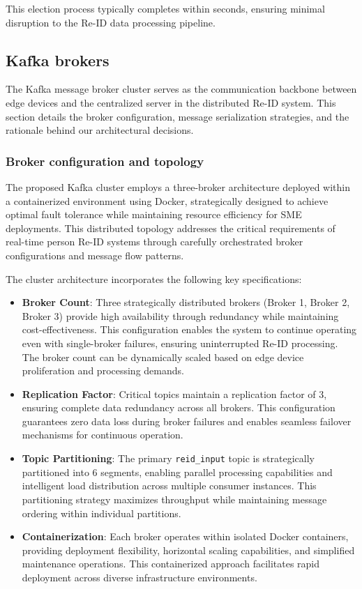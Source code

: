 This election process typically completes within seconds, ensuring minimal disruption to the Re-ID data processing pipeline.

\subsection{Kafka brokers}

The Kafka message broker cluster serves as the communication backbone between edge devices and the centralized server in the distributed Re-ID system. This section details the broker configuration, message serialization strategies, and the rationale behind our architectural decisions.

\subsubsection{Broker configuration and topology}

The proposed Kafka cluster employs a three-broker architecture deployed within a containerized environment using Docker, strategically designed to achieve optimal fault tolerance while maintaining resource efficiency for SME deployments. This distributed topology addresses the critical requirements of real-time person Re-ID systems through carefully orchestrated broker configurations and message flow patterns.

The cluster architecture incorporates the following key specifications:

\begin{itemize}
   \item \textbf{Broker Count}: Three strategically distributed brokers (Broker 1, Broker 2, Broker 3) provide high availability through redundancy while maintaining cost-effectiveness. This configuration enables the system to continue operating even with single-broker failures, ensuring uninterrupted Re-ID processing. The broker count can be dynamically scaled based on edge device proliferation and processing demands.
   \item \textbf{Replication Factor}: Critical topics maintain a replication factor of 3, ensuring complete data redundancy across all brokers. This configuration guarantees zero data loss during broker failures and enables seamless failover mechanisms for continuous operation.
   \item \textbf{Topic Partitioning}: The primary \texttt{reid\_input} topic is strategically partitioned into 6 segments, enabling parallel processing capabilities and intelligent load distribution across multiple consumer instances. This partitioning strategy maximizes throughput while maintaining message ordering within individual partitions.
   \item \textbf{Containerization}: Each broker operates within isolated Docker containers, providing deployment flexibility, horizontal scaling capabilities, and simplified maintenance operations. This containerized approach facilitates rapid deployment across diverse infrastructure environments.
\end{itemize}

